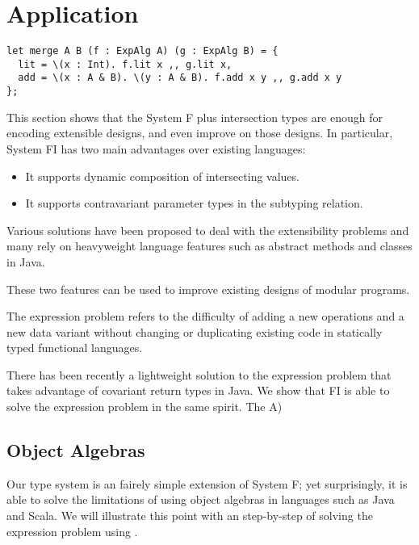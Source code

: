 \section{Application}



\begin{verbatim}
let merge A B (f : ExpAlg A) (g : ExpAlg B) = {
  lit = \(x : Int). f.lit x ,, g.lit x,
  add = \(x : A & B). \(y : A & B). f.add x y ,, g.add x y
};
\end{verbatim}








This section shows that the System F plus intersection types are enough
for encoding extensible designs, and even improve on those designs. In
particular, System FI has two main advantages over existing languages:

\begin{itemize}
\item It supports dynamic composition of intersecting values.
\item It supports contravariant parameter types in the subtyping relation.
\end{itemize}

Various solutions have been proposed to deal with the extensibility problems and
many rely on heavyweight language features such as abstract methods and classes
in Java.

These two features can be used to improve existing designs of modular programs.


The expression problem refers to the difficulty of adding a new operations and a
new data variant without changing or duplicating existing code in statically
typed functional languages.

There has been recently a lightweight solution to the expression problem that
takes advantage of covariant return types in Java. We show that FI is able to
solve the expression problem in the same spirit. The
A)

\subsection{Object Algebras}

Our type system is an fairely simple extension of System F; yet surprisingly, it
is able to solve the limitations of using object algebras in languages such as
Java and Scala. We will illustrate this point with an step-by-step of solving
the expression problem using \systemFI.

